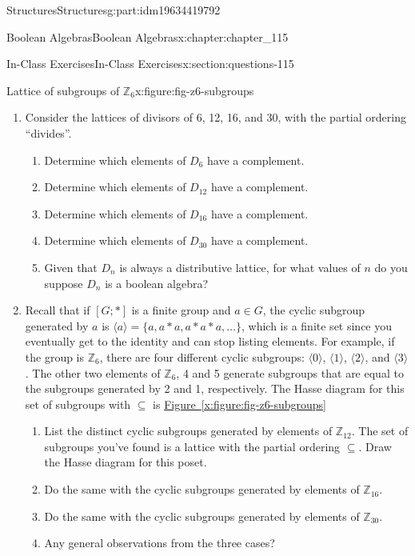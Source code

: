 \documentclass[oneside,10pt,]{book}
\newcommand{\xreffont}{\relax}
\numberwithin{equation}{section}
\begin{document}
\begin{partptx}{Structures}{}{Structures}{}{}{g:part:idm19634419792}
\begin{chapterptx}{Boolean Algebras}{}{Boolean Algebras}{}{}{x:chapter:chapter_115}
\begin{sectionptx}{In-Class Exercises}{}{In-Class Exercises}{}{}{x:section:questions-115}
\begin{figureptx}{Lattice of subgroups of \(\mathbb{Z}_{6}\)}{x:figure:fig-z6-subgroups}{}
\begin{image}{0.3}{0.4}{0.3}
\end{image}%
\tcblower
\end{figureptx}%
%
\begin{enumerate}[label=\arabic*.]
\item{}Consider the lattices of divisors of 6, 12, 16, and 30, with the partial ordering ``divides''.%
\begin{enumerate}[label=(\alph*)]
\item{}Determine which elements of \(D_6\) have a complement.%
\item{}Determine which elements of \(D_{12}\) have a complement.%
\item{}Determine which elements of \(D_{16}\) have a complement.%
\item{}Determine which elements of \(D_{30}\) have a complement.%
\item{}Given that \(D_n\) is always a distributive lattice, for what values of \(n\) do you suppose \(D_n\) is a boolean algebra?%
\end{enumerate}
%
\item{}Recall that if \([G;*]\) is a finite group and \(a \in G\),  the cyclic subgroup generated by \(a\) is \(\langle a \rangle=\{a, a*a, a*a*a, \dots\}\), which is a finite set since you eventually get to the identity and can stop listing elements.  For example, if the group is \(\mathbb{Z}_{6}\), there are four different cyclic subgroups:  \(\langle 0 \rangle\), \(\langle 1 \rangle\), \(\langle 2 \rangle\), and \(\langle 3 \rangle\).  The other two elements of \(\mathbb{Z}_{6}\), 4 and 5 generate subgroups that are equal to the subgroups generated by 2 and 1, respectively.  The Hasse diagram for this set of subgroups with \(\subseteq\) is \hyperref[x:figure:fig-z6-subgroups]{Figure~{\xreffont\ref{x:figure:fig-z6-subgroups}}}%
\par
%
\begin{enumerate}
\item{}List the distinct cyclic subgroups generated by elements of \(\mathbb{Z}_{12}\). The set of subgroups you've found is a lattice with the partial ordering \(\subseteq\). Draw the Hasse diagram for this poset.%
\item{}Do the same with the cyclic subgroups generated by elements of \(\mathbb{Z}_{16}\).%
\item{}Do the same with the cyclic subgroups generated by elements of \(\mathbb{Z}_{30}\).%
\item{}Any general observations from the three cases?%
\end{enumerate}

\end{enumerate}
\end{sectionptx}
\end{chapterptx}
\end{partptx}
\end{document}
